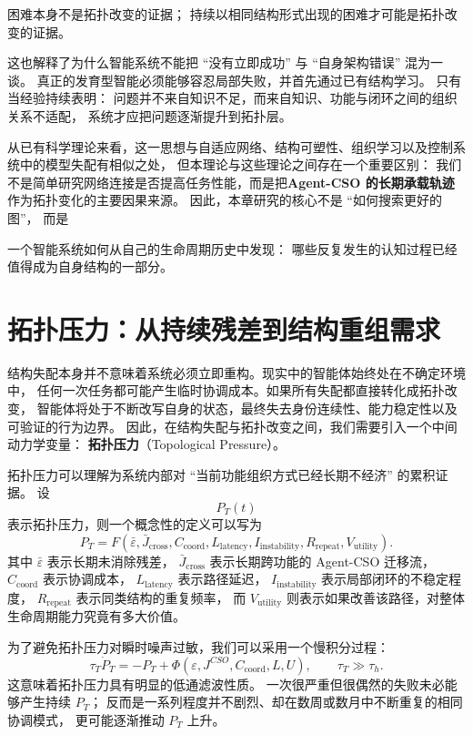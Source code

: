 \begin{proposition*}
困难本身不是拓扑改变的证据；
持续以相同结构形式出现的困难才可能是拓扑改变的证据。
\end{proposition*}

这也解释了为什么智能系统不能把 ``没有立即成功'' 与 ``自身架构错误'' 混为一谈。
真正的发育型智能必须能够容忍局部失败，并首先通过已有结构学习。
只有当经验持续表明：
问题并不来自知识不足，而来自知识、功能与闭环之间的组织关系不适配，
系统才应把问题逐渐提升到拓扑层。

从已有科学理论来看，这一思想与自适应网络、结构可塑性、组织学习以及控制系统中的模型失配有相似之处，
但本理论与这些理论之间存在一个重要区别：
我们不是简单研究网络连接是否提高任务性能，而是把\textbf{Agent-CSO 的长期承载轨迹}
作为拓扑变化的主要因果来源。
因此，本章研究的核心不是 ``如何搜索更好的图''，
而是
\begin{statementbox}
一个智能系统如何从自己的生命周期历史中发现：
哪些反复发生的认知过程已经值得成为自身结构的一部分。
\end{statementbox}

\section{拓扑压力：从持续残差到结构重组需求}

结构失配本身并不意味着系统必须立即重构。现实中的智能体始终处在不确定环境中，
任何一次任务都可能产生临时协调成本。如果所有失配都直接转化成拓扑改变，
智能体将处于不断改写自身的状态，最终失去身份连续性、能力稳定性以及可验证的行为边界。
因此，在结构失配与拓扑改变之间，我们需要引入一个中间动力学变量：
\textbf{拓扑压力}（Topological Pressure）。

拓扑压力可以理解为系统内部对 ``当前功能组织方式已经长期不经济'' 的累积证据。
设
\[
P_T(t)
\]
表示拓扑压力，则一个概念性的定义可以写为
\[
P_T
=
F
\left(
\bar{\varepsilon},
\bar{J}_{\mathrm{cross}},
C_{\mathrm{coord}},
L_{\mathrm{latency}},
I_{\mathrm{instability}},
R_{\mathrm{repeat}},
V_{\mathrm{utility}}
\right).
\]
其中 $\bar{\varepsilon}$ 表示长期未消除残差，
$\bar{J}_{\mathrm{cross}}$ 表示长期跨功能的 Agent-CSO 迁移流，
$C_{\mathrm{coord}}$ 表示协调成本，
$L_{\mathrm{latency}}$ 表示路径延迟，
$I_{\mathrm{instability}}$ 表示局部闭环的不稳定程度，
$R_{\mathrm{repeat}}$ 表示同类结构的重复频率，
而 $V_{\mathrm{utility}}$ 则表示如果改善该路径，对整体生命周期能力究竟有多大价值。

为了避免拓扑压力对瞬时噪声过敏，我们可以采用一个慢积分过程：
\[
\tau_T\dot P_T
=
-
P_T
+
\Phi
\left(
\varepsilon,
J^{CSO},
C_{\mathrm{coord}},
L,
U
\right),
\qquad
\tau_T \gg \tau_h.
\]
这意味着拓扑压力具有明显的低通滤波性质。
一次很严重但很偶然的失败未必能够产生持续 $P_T$；
反而是一系列程度并不剧烈、却在数周或数月中不断重复的相同协调模式，
更可能逐渐推动 $P_T$ 上升。

